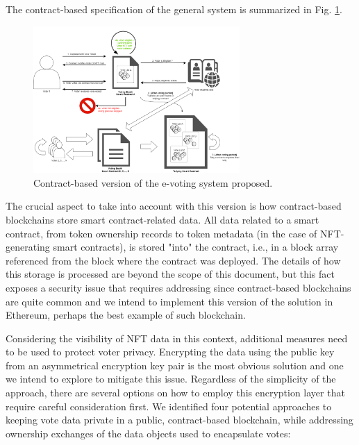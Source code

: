 \documentclass[./4_GeneralApproach.tex]{subfiles}
\begin{document}
    The contract-based specification of the general system is summarized in Fig. \ref{fig:contract_based_architecture}.

    \begin{figure}[htp]
        \centering
        \includegraphics[width=0.7\textwidth]{../Images/02_contract_based_solution.png}
        \caption{Contract-based version of the e-voting system proposed.}
        \label{fig:contract_based_architecture}
    \end{figure}

    The crucial aspect to take into account with this version is how contract-based blockchains store smart contract-related data. All data related to a smart contract, from token ownership records to token metadata (in the case of NFT-generating smart contracts), is stored "into" the contract, i.e., in a block array referenced from the block where the contract was deployed. The details of how this storage is processed are beyond the scope of this document, but this fact exposes a security issue that requires addressing since contract-based blockchains are quite common and we intend to implement this version of the solution in Ethereum, perhaps the best example of such blockchain.
    \par
    Considering the visibility of NFT data in this context, additional measures need to be used to protect voter privacy. Encrypting the data using the public key from an asymmetrical encryption key pair is the most obvious solution and one we intend to explore to mitigate this issue. Regardless of the simplicity of the approach, there are several options on how to employ this encryption layer that require careful consideration first. We identified four potential approaches to keeping vote data private in a public, contract-based blockchain, while addressing ownership exchanges of the data objects used to encapsulate votes:
    
\end{document}
